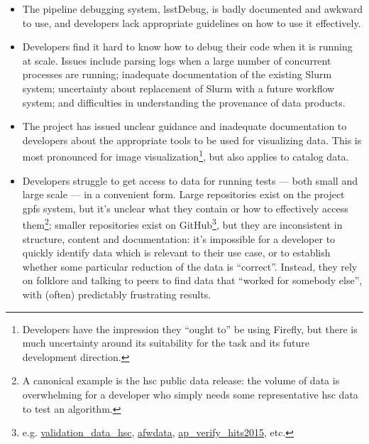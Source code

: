 \begin{itemize}

  \item{The pipeline debugging system, lsstDebug, is badly documented and
  awkward to use, and developers lack appropriate guidelines on how to use it
  effectively.}

  \item{Developers find it hard to know how to debug their code when it is
  running at scale. Issues include parsing logs when a large number of
  concurrent processes are running; inadequate documentation of the existing
  Slurm system; uncertainty about replacement of Slurm with a future workflow
  system; and difficulties in understanding the provenance of data products.}

  \item{The project has issued unclear guidance and inadequate documentation
  to developers about the appropriate tools to be used for visualizing data.
  This is most pronounced for image visualization\footnote{Developers have the
  impression they ``ought to'' be using Firefly, but there is much uncertainty
  around its suitability for the task and its future development direction.},
  but also applies to catalog data.}

  \item{Developers struggle to get access to data for running tests --- both
  small and large scale --- in a convenient form. Large repositories exist on
  the project \gls{gpfs} system, but it's unclear what they contain or how
  to effectively access them\footnote{A canonical example is the \gls{hsc}
  public data release: the volume of data is overwhelming for a developer who
  simply needs some representative \gls{hsc} data to test an algorithm.};
  smaller repositories exist on GitHub\footnote{e.g.
  \href{https://github.com/lsst/validation_data_hsc}{validation\_data\_hsc},
  \href{https://github.com/lsst/afwdata}{afwdata},
  \href{https://github.com/lsst/ap_verify_hits2015}{ap\_verify\_hits2015},
  etc.}, but they are inconsistent in structure, content and documentation:
  it's impossible for a developer to quickly identify data which is relevant
  to their use case, or to establish whether some particular reduction of the
  data is ``correct''. Instead, they rely on folklore and talking to peers to
  find data that ``worked for somebody else'', with (often) predictably
  frustrating results.}

\end{itemize}

